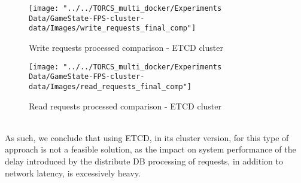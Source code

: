 \begin{figure}[h!]
	\centering
	\texttt{[image: "../../TORCS\_multi\_docker/Experiments Data/GameState-FPS-cluster-data/Images/write\_requests\_final\_comp"]}
	\caption[Write requests processed comparison - ETCD cluster]{Write requests processed comparison - ETCD cluster}
	\label{fig:write-requests-comparison-etcd-cluster}
\end{figure}
\begin{figure}[h!]
	\centering
	\texttt{[image: "../../TORCS\_multi\_docker/Experiments Data/GameState-FPS-cluster-data/Images/read\_requests\_final\_comp"]}
	\caption[Read requests processed comparison - ETCD cluster]{Read requests processed comparison - ETCD cluster}
	\label{fig:read-requests-comparison-etcd-cluster}
\end{figure}
\\ As such, we conclude that using ETCD, in its cluster version, for this type of approach is not a feasible solution, as the impact on system performance of the delay introduced by the distribute DB processing of requests, in addition to network latency, is excessively heavy.

